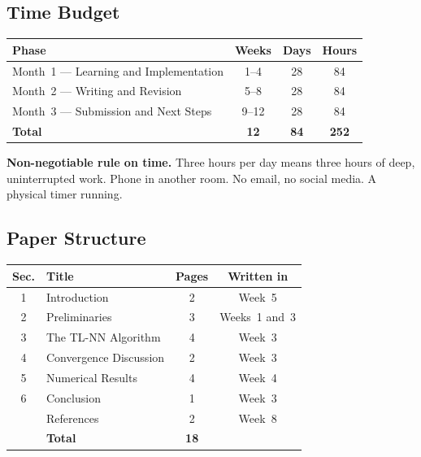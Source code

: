 \documentclass[12pt,a4paper]{article}
\begin{document}
\subsection{Time Budget}

\begin{center}
\begin{tabular}{lccc}
\toprule
\textbf{Phase} & \textbf{Weeks} & \textbf{Days} & \textbf{Hours} \\
\midrule
Month~1 --- Learning and Implementation & 1--4  & 28 & 84 \\
Month~2 --- Writing and Revision        & 5--8  & 28 & 84 \\
Month~3 --- Submission and Next Steps   & 9--12 & 28 & 84 \\
\midrule
\textbf{Total} & \textbf{12} & \textbf{84} & \textbf{252} \\
\bottomrule
\end{tabular}
\end{center}

\begin{tcolorbox}[warningstyle]
\noindent\textbf{Non-negotiable rule on time.}
Three hours per day means three hours of deep, uninterrupted
work. Phone in another room. No email, no social media.
A physical timer running.
\end{tcolorbox}

\subsection{Paper Structure}

\begin{center}
\begin{tabular}{clcc}
\toprule
\textbf{Sec.} & \textbf{Title} & \textbf{Pages} & \textbf{Written in} \\
\midrule
1 & Introduction           & 2  & Week~5 \\
2 & Preliminaries          & 3  & Weeks~1 and~3 \\
3 & The TL-NN Algorithm    & 4  & Week~3 \\
4 & Convergence Discussion & 2  & Week~3 \\
5 & Numerical Results      & 4  & Week~4 \\
6 & Conclusion             & 1  & Week~3 \\
  & References             & 2  & Week~8 \\
\midrule
  & \textbf{Total}         & \textbf{18} & \\
\bottomrule
\end{tabular}
\end{center}
\end{document}
